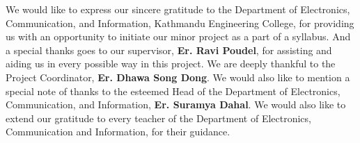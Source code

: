 We would like to express our sincere gratitude to the Department of Electronics, Communication, and Information, Kathmandu Engineering College, for providing us with an opportunity to initiate our minor project as a part of a syllabus. And a special thanks goes to our supervisor, \textbf{Er. Ravi Poudel}, for assisting and aiding us in every possible way in this project. We are deeply thankful to the Project Coordinator, \textbf{Er. Dhawa Song Dong}. We would also like to mention a special note of thanks to the esteemed Head of the Department of Electronics, Communication, and Information, \textbf{Er. Suramya Dahal}. We would also like to extend our gratitude to every teacher of the Department of Electronics, Communication and Information, for their guidance.